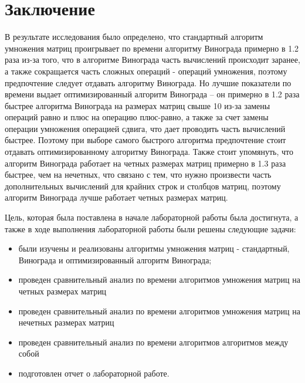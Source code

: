 \chapter*{Заключение}

В результате исследования было определено, что стандартный алгоритм умножения матриц проигрывает по времени алгоритму Винограда примерно в 1.2 раза из-за того, что в алгоритме Винограда часть вычислений происходит заранее, а также сокращается часть сложных операций - операций умножения, поэтому предпочтение следует отдавать алгоритму Винограда. Но лучшие показатели по времени выдает оптимизированный алгоритм Винограда -- он примерно в 1.2 раза быстрее алгоритма Винограда на размерах матриц свыше 10 из-за замены операций равно и плюс на операцию плюс-равно, а также за счет замены операции умножения операцией сдвига, что дает проводить часть вычислений быстрее. Поэтому при выборе самого быстрого алгоритма предпочтение стоит отдавать оптимизированному алгоритму Винограда. Также стоит упомянуть, что алгоритм Винограда работает на четных размерах матриц примерно в 1.3 раза быстрее, чем на нечетных, что связано с тем, что нужно произвести часть дополнительных вычислений для крайних строк и столбцов матриц, поэтому алгоритм Винограда лучше работает четных размерах матриц.


Цель, которая была поставлена в начале лабораторной работы была достигнута, а также в ходе выполнения лабораторной работы были решены следующие задачи:

\begin{itemize}
	\item были изучены и реализованы алгоритмы умножения матриц - стандартный, Винограда и оптимизированный алгоритм Винограда;
    \item проведен сравнительный анализ по времени алгоритмов умножения матриц на четных размерах матриц
	\item проведен сравнительный анализ по времени алгоритмов умножения матриц на нечетных размерах матриц
	\item проведен сравнительный анализ по времени алгоритмов алгоритмов между собой
	\item подготовлен отчет о лабораторной работе.
\end{itemize}